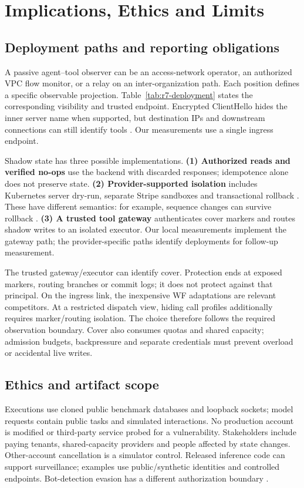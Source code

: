 \section{Implications, Ethics and Limits}\label{sec:agenda}
\subsection{Deployment paths and reporting obligations}\label{sec:deployment}
A passive agent--tool observer can be an access-network operator, an authorized VPC flow monitor, or a relay on an inter-organization path. Each position defines a specific observable projection. Table~\ref{tab:r7-deployment} states the corresponding visibility and trusted endpoint. Encrypted ClientHello hides the inner server name when supported, but destination IPs and downstream connections can still identify tools \cite{rfc9849}. Our measurements use a single ingress endpoint.


Shadow state has three possible implementations. \textbf{(1) Authorized reads and verified no-ops} use the backend with discarded responses; idempotence alone does not preserve state. \textbf{(2) Provider-supported isolation} includes Kubernetes server dry-run, separate Stripe sandboxes and transactional rollback \cite{kubernetesdryrun,stripesandboxes,postgresrollback}. These have different semantics: for example, sequence changes can survive rollback \cite{postgressequences}. \textbf{(3) A trusted tool gateway} authenticates cover markers and routes shadow writes to an isolated executor. Our local measurements implement the gateway path; the provider-specific paths identify deployments for follow-up measurement.

The trusted gateway/executor can identify cover. Protection ends at exposed markers, routing branches or commit logs; it does not protect against that principal. On the ingress link, the inexpensive WF adaptations are relevant competitors. At a restricted dispatch view, hiding call profiles additionally requires marker/routing isolation. The choice therefore follows the required observation boundary. Cover also consumes quotas and shared capacity; admission budgets, backpressure and separate credentials must prevent overload or accidental live writes.

\subsection{Ethics and artifact scope}\label{sec:ethics}
Executions use cloned public benchmark databases and loopback sockets; model requests contain public tasks and simulated interactions. No production account is modified or third-party service probed for a vulnerability. Stakeholders include paying tenants, shared-capacity providers and people affected by state changes. Other-account cancellation is a simulator control. Released inference code can support surveillance; examples use public/synthetic identities and controlled endpoints. Bot-detection evasion has a different authorization boundary \cite{zhu2026turing,jeong2026wra}.

